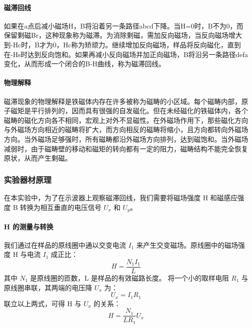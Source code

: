 \documentclass[]{../template/Report}%
\begin{document}
\paragraph{磁滞回线} 如果在a点后减小磁场H，B将沿着另一条路径abcd下降。当H=0时，B不为0，而保留剩磁Br，这种现象称为磁滞。为消除剩磁，需加反向磁场，当反向磁场增大到-Hc时，B才为0，Hc称为矫顽力。继续增加反向磁场，样品将反向磁化，直到在-Hs时达到反向饱和。如果再减小反向磁场并加正向磁场，B将沿另一条路径defa变化，从而形成一个闭合的B-H曲线，称为磁滞回线。

\paragraph{物理解释} 磁滞现象的物理解释是铁磁体内存在许多被称为磁畴的小区域。每个磁畴内部，原子磁矩是平行排列的，因而具有很强的自发磁化。但在未经磁化的铁磁体内，各个磁畴的磁化方向各不相同，宏观上对外不显磁性。在外磁场作用下，那些磁化方向与外磁场方向相近的磁畴将扩大，而方向相反的磁畴将缩小，且方向都转向外磁场方向。当外磁场足够强时，所有磁畴都沿外磁场方向排列，达到磁饱和。当外磁场减弱时，由于磁畴壁的移动和磁矩的转向都有一定的阻力，磁畴结构不能完全恢复原状，从而产生剩磁。

\subsubsection{实验器材原理}
在本实验中，为了在示波器上观察磁滞回线，我们需要将磁场强度 H 和磁感应强度 B 转换为相互垂直的电压信号 $U_x$ 和 $U_y$。

\paragraph{H 的测量与转换}
我们通过在样品的原线圈中通以交变电流 $I_1$ 来产生交变磁场。原线圈中的磁场强度 H 与电流 $I_1$ 成正比：
\begin{equation}
    H = \frac{N_1 I_1}{L}
\end{equation}
其中 $N_1$ 是原线圈的匝数，L 是样品的有效磁路长度。
将一个小的取样电阻 $R_1$ 与原线圈串联，其两端的电压降 $U_x$ 为：
\begin{equation}
    U_x = I_1 R_1
\end{equation}
联立以上两式，可得 H 与 $U_x$ 的关系：
\begin{equation}
    \boxed{H = \frac{N_1}{L R_1} U_x}
\end{equation}
\end{document}
